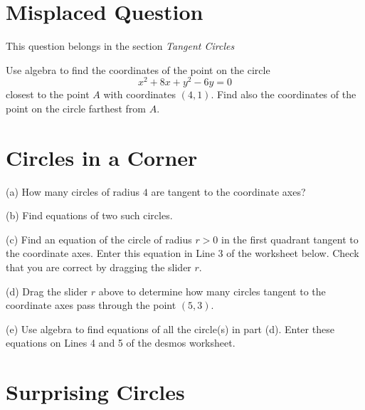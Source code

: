 \documentclass{ximera}
\begin{document}
\section*{Misplaced Question}  
This question belongs in the section \emph{Tangent Circles}

\begin{question}   \label{Q:3435r55533}
Use algebra to find the coordinates of the point on the circle
\[
     x^2 + 8x + y^2 - 6y = 0
\]
closest to the point $A$ with coordinates $(4,1)$. Find also the coordinates of the point on the circle farthest from $A$.
\end{question}



\section*{Circles in a Corner}
\begin{question}  \label{Q3442dsfdsf55t}
(a) How many circles of radius $4$ are tangent to the coordinate axes? 

(b) Find equations of two such circles.

(c) Find an equation of the circle of radius $r > 0$ in the first quadrant tangent to the coordinate axes. Enter this equation in Line 3 of the worksheet below. Check that you are correct by dragging the slider $r$.

\begin{exploration}
\begin{onlineOnly}
    \begin{center}
\end{center}
\end{onlineOnly}

(d) Drag the slider $r$ above to determine how many circles tangent to the coordinate axes pass through the point $(5,3)$. 

(e) Use algebra to find equations of all the circle(s) in part (d). Enter these equations on Lines 4 and 5 of the desmos worksheet.



\end{exploration}

\end{question}




\section*{Surprising Circles}
\end{document}
